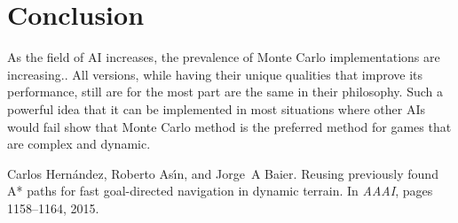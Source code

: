 \documentclass[11pt]{article}
\begin{document}
\section{Conclusion}

As the field of AI increases, the prevalence of Monte Carlo implementations are increasing.. All versions, while having their unique qualities that improve its performance, still are for the most part are the same in their philosophy. Such a powerful idea that it can be implemented in most situations where other AIs would fail show that Monte Carlo method is the preferred method for games that are complex and dynamic. 







\begin{thebibliography}{1} %

Carlos Hern{\'a}ndez, Roberto As{\'\i}n, and Jorge~A Baier.
\newblock Reusing previously found {A}* paths for fast goal-directed navigation
  in dynamic terrain.
\newblock In {\em AAAI}, pages 1158--1164, 2015.

\end{thebibliography}

\end{document}
